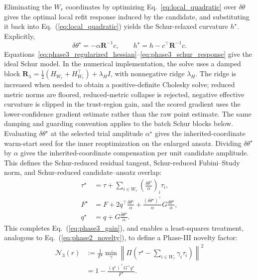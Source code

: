 \documentclass[
  reprint,
  amsmath,
  amssymb,
  aps,
  pra,
  nofootinbib,
  superscriptaddress,
  floatfix
]{revtex4-2}
\begin{document}
Eliminating the \(W_r\) coordinates by optimizing Eq.~\ref{eq:local_quadratic} over $\delta\theta$ gives the optimal local refit response induced by the candidate, and substituting it back into Eq.~(\ref{eq:local_quadratic}) yields the Schur-relaxed curvature $h^\star$. Explicitly,
\begin{equation}
\delta\theta^\star=-\alpha\mathbf R^{-1}c,
\qquad
h^\star=h-c^{\top}\mathbf R^{-1}c .
\label{eq:phase3_schur_response}
\end{equation}
Equations~\eqref{eq:phase3_regularized_hessian}--\eqref{eq:phase3_schur_response} give the ideal Schur model. In the numerical implementation, the solve uses a damped block
\(\mathbf R_{\lambda}=\frac12(H_{W_r}+H_{W_r}^{\top})+\lambda_H I\),
with nonnegative ridge \(\lambda_H\). The ridge is increased when needed to
obtain a positive-definite Cholesky solve; reduced metric norms are floored,
reduced-metric collapse is rejected, negative effective curvature is clipped in
the trust-region gain, and the scored gradient uses the lower-confidence
gradient estimate rather than the raw point estimate. The same damping and
guarding convention applies to the batch Schur blocks below.
Evaluating $\delta\theta^\star$ at the selected trial amplitude $\alpha^\star$ gives the inherited-coordinate warm-start seed for the inner reoptimization on the enlarged ansatz. Dividing $\delta\theta^\star$ by $\alpha$ gives the inherited-coordinate compensation per unit candidate amplitude. This defines the Schur-reduced residual tangent, Schur-reduced Fubini--Study norm, and Schur-reduced candidate--ansatz overlap:
\begin{equation}
\begin{aligned}
\tau^\star
&=\tau+\sum_{i\in W_r}\left(\frac{\delta\theta^\star}{\alpha}\right)_i\tau_i,\\
F^\star
&=F+2q^{\top}\frac{\delta\theta^\star}{\alpha}
+\frac{(\delta\theta^\star)^{\top}}{\alpha}G\frac{\delta\theta^\star}{\alpha},\\
q^\star
&=q+G\frac{\delta\theta^\star}{\alpha}.
\end{aligned}
\label{eq:phase3_star_geometry}
\end{equation}
This completes Eq.~(\ref{eq:phase3_gain}), and enables a least-squares treatment, analogous to Eq.~(\ref{eq:phase2_novelty}), to define a Phase-III novelty factor:
\begin{equation}
\begin{aligned}
\mathcal N_3(r)
&:=
\frac{1}{F^\star}
\min_{\gamma}
\left\|
\Pi\left(\tau^\star-\sum_{i\in W_r}\gamma_i\tau_i\right)
\right\|^2 \\
&=
1-\frac{(q^\star)^{\top}G^+q^\star}
{F^\star}.
\end{aligned}
\label{eq:phase3_novelty}
\end{equation}
\end{document}
